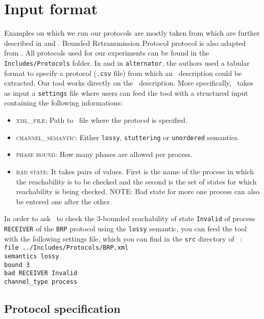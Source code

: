 \section{Input format}
\label{sec:input}

Examples on which we run our protocols are mostly taken from \cite{JRSVgit} 
which are further described in \cite{MPSV11} and \cite{RSV11}.
Bounded Retransmission Protocol protocol is also adapted from \cite{AABJ04}.
All protocols used for our experiments can be found in the \texttt{Includes/Protocols} folder.
%
In \cite{JRSVgit} and in \texttt{alternator}, the authors used a tabular format to specify a protocol (\texttt{.csv} file)
from which an \xml\ description could be extracted.
Our tool works directly on the \xml\ description.
%
More specifically, \MPass\ takes as input a \texttt{settings} file where users can feed the tool with a structured input containing the following informations:

\begin{itemize}
\item \textsc{xml\_file}: Path to \xml\ file where the protocol is specified.
\item \textsc{channel\_semantic}: Either \texttt{lossy}, \texttt{stuttering} or \texttt{unordered} semantics.
\item \textsc{phase bound}: How many phases are allowed per process.
\item \textsc{bad state}: It takes pairs of values.
%
First is the name of the process in which the reachability is to be checked and the second is the set of states for which reachability is being checked.
NOTE: Bad state for more one process can also be entered one after the other.
\end{itemize}

In order to ask \MPass\ to check the $3$-bounded reachability of state \texttt{Invalid} of process \texttt{RECEIVER} of the \texttt{BRP} protocol
using the \texttt{lossy} semantic,
you can feed the tool with the following settings file, which you can find in the \texttt{src} directory of \MPass\ :\\
\texttt{file ../Includes/Protocols/BRP.xml}\\
\texttt{semantics lossy}\\
\texttt{bound 3}\\
\texttt{bad RECEIVER Invalid}\\
\texttt{channel\_type process}

\subsection*{Protocol specification}

